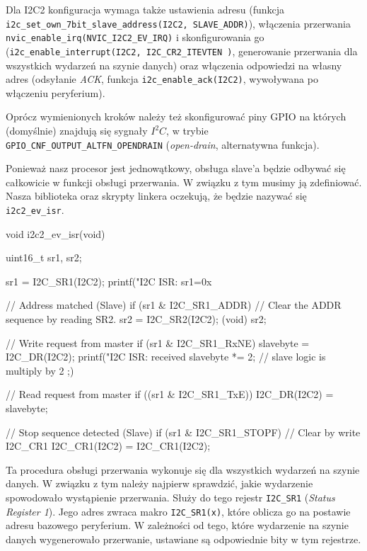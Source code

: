 Dla I2C2 konfiguracja wymaga także ustawienia adresu (funkcja \Verb$i2c_set_own_7bit_slave_address(I2C2, SLAVE_ADDR)$), włączenia przerwania
\Verb$nvic_enable_irq(NVIC_I2C2_EV_IRQ)$ i skonfigurowania go (\Verb$i2c_enable_interrupt(I2C2, I2C_CR2_ITEVTEN )$, generowanie przerwania dla wszystkich wydarzeń na szynie danych) oraz włączenia odpowiedzi na własny adres (odsyłanie \textit{ACK}, funkcja \Verb$i2c_enable_ack(I2C2)$,
wywoływana po włączeniu peryferium).

Oprócz wymienionych kroków należy też skonfigurować piny GPIO na których (domyślnie) znajdują się sygnały $I^2C$, w trybie
\Verb$GPIO_CNF_OUTPUT_ALTFN_OPENDRAIN$ (\textit{open-drain}, alternatywna funkcja).

Ponieważ nasz procesor jest jednowątkowy, obsługa slave'a będzie odbywać się całkowicie w funkcji obsługi przerwania. W związku z tym musimy ją
zdefiniować. Nasza biblioteka oraz skrypty linkera oczekują, że będzie nazywać się \Verb$i2c2_ev_isr$.

\begin{CodeFrame*}[c]{}
void i2c2_ev_isr(void){
  uint16_t sr1, sr2;

  sr1 = I2C_SR1(I2C2);
  printf("I2C ISR: sr1=0x%

  // Address matched (Slave)
  if (sr1 & I2C_SR1_ADDR){
    // Clear the ADDR sequence by reading SR2.
    sr2 = I2C_SR2(I2C2);
    (void) sr2;
  }

  // Write request from master
  if (sr1 & I2C_SR1_RxNE){
    slavebyte = I2C_DR(I2C2);
    printf("I2C ISR: received %
    slavebyte *= 2; // slave logic is multiply by 2 ;)
  }

  // Read request from master
  if ((sr1 & I2C_SR1_TxE)){
    I2C_DR(I2C2) = slavebyte;
  }

  // Stop sequence detected (Slave)
  if (sr1 & I2C_SR1_STOPF){
    // Clear by write I2C_CR1
    I2C_CR1(I2C2) = I2C_CR1(I2C2);
  }
}
\end{CodeFrame*}

Ta procedura obsługi przerwania wykonuje się dla wszystkich wydarzeń na szynie danych. W związku z tym należy najpierw sprawdzić, jakie wydarzenie
spowodowało wystąpienie przerwania. Służy do tego rejestr \Verb$I2C_SR1$ (\textit{Status Register 1}). Jego adres zwraca makro \Verb$I2C_SR1(x)$,
które oblicza go na postawie adresu bazowego peryferium. W zależności od tego, które wydarzenie na szynie danych wygenerowało przerwanie, ustawiane
są odpowiednie bity w tym rejestrze.\\

